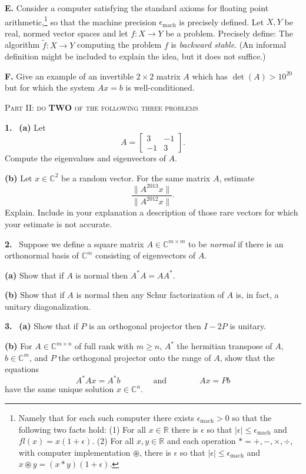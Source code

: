 \documentclass[11pt]{amsart}
\newcommand{\CC}{{\mathbb{C}}}
\newcommand{\RR}{{\mathbb{R}}}
\newcommand{\eps}{\epsilon}
\newcommand{\emach}{\epsilon_{\mathrm{mach}}}
\newcommand{\prob}[1]{\bigskip\noindent\large\textbf{#1.} \, \normalsize}
\newcommand{\probpts}[2]{\bigskip\noindent\textbf{#1.} \quad}
\newcommand{\epartpts}[2]{\textbf{(#1)} \quad}
\newcommand{\partpts}[2]{\medskip\noindent \textbf{(#1)} \quad}
\begin{document}
\probpts{E}{5}  Consider a computer satisfying the standard axioms for floating point arithmetic,\footnote{Namely that for each such computer there exists $\emach>0$ so that the following two facts hold:  (1) For all $x\in\RR$ there is $\eps$ so that $|\eps|\le \emach$ and $fl(x)=x(1+\eps)$.  (2) For all $x,y\in\RR$ and each operation $\ast = +,-,\times,\div$, with computer implementation $\circledast$, there is $\eps$ so that $|\eps|\le \emach$ and $x\circledast y = (x\ast y)(1+\eps)$.} so that the machine precision $\emach$ is precisely defined.  Let $X,Y$ be real, normed vector spaces and let $f:X\to Y$ be a problem.  Precisely define:  The algorithm $\tilde f:X\to Y$ computing the problem $f$ is \emph{backward stable}.  (An informal definition might be included to explain the idea, but it does not suffice.)

\probpts{F}{5}  Give an example of an invertible $2\times 2$ matrix $A$ which has $\det(A) > 10^{20}$ but for which the system $Ax=b$ is well-conditioned.

\newpage
\phantom{foo}
\bigskip
\centerline{\textsc{Part II:  do \textbf{TWO} of the following three problems}}

\bigskip
\prob{1} \epartpts{a}{5}  Let
	$$A=\begin{bmatrix} 3 & -1 \\ -1 & 3 \end{bmatrix}.$$
Compute the eigenvalues and eigenvectors of $A$.

\partpts{b}{5}  Let $x\in\CC^2$ be a random vector.  For the same matrix $A$, estimate
	$$\frac{\|A^{2013}x\|}{\|A^{2012}x\|}.$$
Explain.  Include in your explanation a description of those rare vectors for which your estimate is not accurate.

\prob{2}  Suppose we define a square matrix $A\in\CC^{m\times m}$ to be \emph{normal} if there is an orthonormal basis of $\CC^m$ consisting of eigenvectors of $A$.

\partpts{a}{5}  Show that if $A$ is normal then $A^* A = A A^*$.

\partpts{b}{5}  Show that if $A$ is normal then any Schur factorization of $A$ is, in fact, a unitary diagonalization.

\prob{3} \epartpts{a}{5}  Show that if $P$ is an orthogonal projector then $I-2P$ is unitary.

\partpts{b}{5}  For $A\in\CC^{m\times n}$ of full rank with $m\ge n$, $A^*$ the hermitian transpose of $A$, $b\in\CC^m$, and $P$ the orthogonal projector onto the range of $A$, show that the equations
	$$A^* A x = A^* b \qquad \qquad \text{and} \qquad \qquad Ax = Pb$$
have the same unique solution $x\in\CC^n$.
\end{document}
